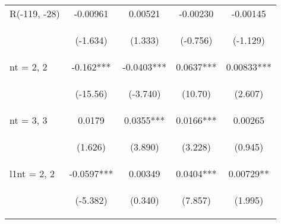 \documentclass[]{article}
\begin{document}
\begin{center}
\begin{tabular}{lcccc}
R(-119, -28) & -0.00961 & 0.00521 & -0.00230 & -0.00145 \\
\vspace{4pt} & \begin{footnotesize}(-1.634)\end{footnotesize} & \begin{footnotesize}(1.333)\end{footnotesize} & \begin{footnotesize}(-0.756)\end{footnotesize} & \begin{footnotesize}(-1.129)\end{footnotesize} \\
nt = 2, 2 & -0.162*** & -0.0403*** & 0.0637*** & 0.00833*** \\
\vspace{4pt} & \begin{footnotesize}(-15.56)\end{footnotesize} & \begin{footnotesize}(-3.740)\end{footnotesize} & \begin{footnotesize}(10.70)\end{footnotesize} & \begin{footnotesize}(2.607)\end{footnotesize} \\
nt = 3, 3 & 0.0179 & 0.0355*** & 0.0166*** & 0.00265 \\
\vspace{4pt} & \begin{footnotesize}(1.626)\end{footnotesize} & \begin{footnotesize}(3.890)\end{footnotesize} & \begin{footnotesize}(3.228)\end{footnotesize} & \begin{footnotesize}(0.945)\end{footnotesize} \\
l1nt = 2, 2 & -0.0597*** & 0.00349 & 0.0404*** & 0.00729** \\
\vspace{4pt} & \begin{footnotesize}(-5.382)\end{footnotesize} & \begin{footnotesize}(0.340)\end{footnotesize} & \begin{footnotesize}(7.857)\end{footnotesize} & \begin{footnotesize}(1.995)\end{footnotesize} \\

\end{tabular}
\end{center}
\end{document}
